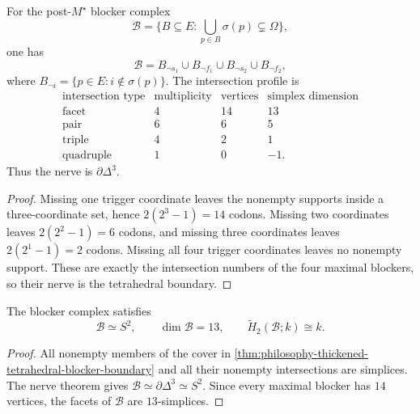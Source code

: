 \begin{theorem}
\label{thm:philosophy-thickened-tetrahedral-blocker-boundary}
For the post-$M^{\star}$ blocker complex
$$
  \mathcal{B}
  =
  \{B\subseteq E:\bigcup_{p\in B}\sigma(p)\subsetneq\Omega\},
$$
one has
$$
  \mathcal{B}
  =
  B_{\neg s_{1}}
  \cup
  B_{\neg f_{1}}
  \cup
  B_{\neg s_{2}}
  \cup
  B_{\neg f_{2}},
$$
where $B_{\neg i}=\{p\in E:i\notin\sigma(p)\}$. The intersection
profile is
$$
\begin{array}{c|r|r|r}
  \text{intersection type} & \text{multiplicity} & \text{vertices} & \text{simplex dimension}\\
  \hline
  \text{facet} & 4 & 14 & 13\\
  \text{pair} & 6 & 6 & 5\\
  \text{triple} & 4 & 2 & 1\\
  \text{quadruple} & 1 & 0 & -1.
\end{array}
$$
Thus the nerve is $\partial\Delta^{3}$.
\end{theorem}
\begin{proof}
Missing one trigger coordinate leaves the nonempty supports inside a
three-coordinate set, hence $2(2^{3}-1)=14$ codons. Missing two
coordinates leaves $2(2^{2}-1)=6$ codons, and missing three coordinates
leaves $2(2^{1}-1)=2$ codons. Missing all four trigger coordinates
leaves no nonempty support. These are exactly the intersection numbers
of the four maximal blockers, so their nerve is the tetrahedral
boundary.
\end{proof}


\begin{corollary}
\label{cor:philosophy-blocker-thickened-sphere-dimension}
The blocker complex satisfies
$$
  \mathcal{B}\simeq S^{2},
  \qquad
  \dim\mathcal{B}=13,
  \qquad
  \widetilde{H}_{2}(\mathcal{B};k)\cong k.
$$
\end{corollary}
\begin{proof}
All nonempty members of the cover in
\autoref{thm:philosophy-thickened-tetrahedral-blocker-boundary} and all
their nonempty intersections are simplices. The nerve theorem gives
$\mathcal{B}\simeq\partial\Delta^{3}\simeq S^{2}$. Since every maximal
blocker has $14$ vertices, the facets of $\mathcal{B}$ are
$13$-simplices.
\end{proof}

